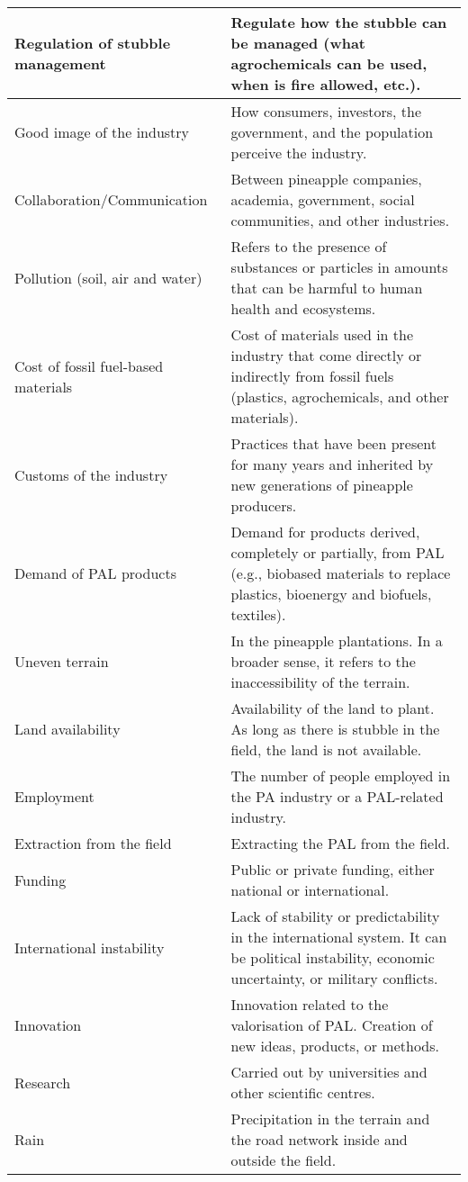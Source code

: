 \begin{appendices}
\begin{xltabular}{\textwidth}{XX}
Regulation of stubble management &
  Regulate how the stubble can be managed (what agrochemicals can be used,  when is fire allowed, etc.). \\ \hline
Good image of the industry &
  How consumers, investors, the government, and the population perceive the industry. \\ \hline
Collaboration/Communication &
  Between pineapple companies, academia, government, social communities, and other industries. \\ \hline
Pollution (soil, air and water) &
  Refers to the presence of substances or particles in amounts that can be harmful to human health and ecosystems. \\ \hline
Cost of fossil fuel-based materials &
  Cost of materials used in the industry that come directly or indirectly from fossil fuels (plastics, agrochemicals, and other materials). \\ \hline
Customs of the industry &
  Practices that have been present for many years and inherited by new generations of pineapple producers. \\ \hline
Demand of PAL products &
  Demand for products derived, completely or partially, from PAL (e.g., biobased materials to replace plastics, bioenergy and biofuels, textiles). \\ \hline
Uneven terrain &
  In the pineapple plantations. In a broader sense, it refers to the inaccessibility of the terrain. \\ \hline
Land availability &
  Availability of the land to plant. As long as there is stubble in the field, the land is not available. \\ \hline
Employment &
  The number of people employed in the PA industry or a PAL-related industry. \\ \hline
Extraction from the field &
  Extracting the PAL from the field. \\ \hline
Funding &
  Public or private funding, either national or international. \\ \hline
International instability &
  Lack of stability or predictability in the international system. It can be political instability, economic uncertainty, or military conflicts. \\ \hline
Innovation &
  Innovation related to the valorisation of PAL. Creation of new ideas, products, or methods. \\ \hline
Research &
  Carried out by universities and other scientific centres. \\ \hline
Rain &
  Precipitation in the terrain and the road network inside and outside the field. \\ \hline

\end{xltabular}
\end{appendices}
